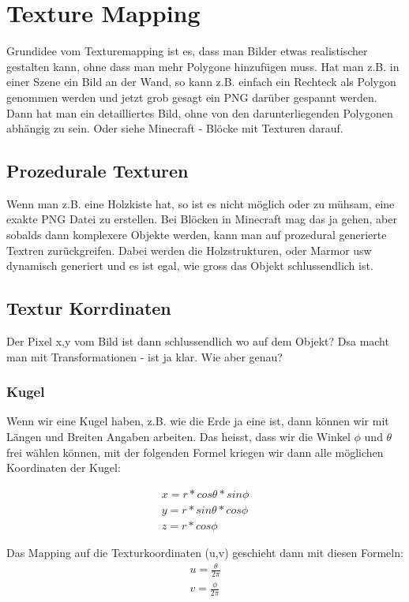\chapter{Texture Mapping}
Grundidee vom Texturemapping ist es, dass man Bilder etwas realistischer gestalten kann, ohne dass man mehr Polygone hinzufügen muss. Hat man z.B. in einer Szene ein Bild an der Wand, so kann z.B. einfach ein Rechteck als Polygon genommen werden und jetzt grob gesagt ein PNG darüber gespannt werden. Dann hat man ein detailliertes Bild, ohne von den darunterliegenden Polygonen abhängig zu sein. Oder siehe Minecraft - Blöcke mit Texturen darauf.

\section{Prozedurale Texturen}
Wenn man z.B. eine Holzkiste hat, so ist es nicht möglich oder zu mühsam, eine exakte PNG Datei zu erstellen. Bei Blöcken in Minecraft mag das ja gehen, aber sobalds dann komplexere Objekte werden, kann man auf prozedural generierte Textren zurückgreifen. Dabei werden die Holzstrukturen, oder Marmor usw dynamisch generiert und es ist egal, wie gross das Objekt schlussendlich ist.

\section{Textur Korrdinaten}
Der Pixel x,y vom Bild ist dann schlussendlich wo auf dem Objekt? Dsa macht man mit Transformationen - ist ja klar. Wie aber genau?
\subsection{Kugel}
Wenn wir eine Kugel haben, z.B. wie die Erde ja eine ist, dann können wir mit Längen und Breiten Angaben arbeiten. Das heisst, dass wir die Winkel \(\phi\) und \(\theta\) frei wählen können, mit der folgenden Formel kriegen wir dann alle möglichen Koordinaten der Kugel:

\begin{gather}
x = r*cos \theta * sin \phi\\
y = r*sin \theta * cos \phi\\
z = r*cos\phi
\end{gather}

Das Mapping auf die Texturkoordinaten (u,v) geschieht dann mit diesen Formeln:
\begin{gather}
u = \frac{\theta}{2\pi}\\
v = \frac{\phi}{2\pi}\\
\end{gather}
